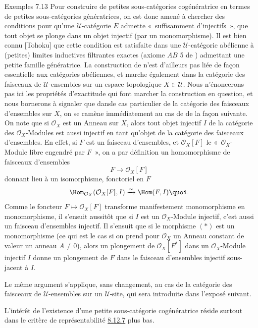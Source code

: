\begin{enonce*}[remark]{Exemples 7.13}
Pour construire de petites sous-catégories cogénératrice en termes
de petites sous-catégories génératrices, on est donc amené à
chercher des conditions pour qu'une $𝒰$-catégorie $E$
admette « suffisamment d'injectifs », \ie que tout objet se
plonge dans un objet injectif (par un monomorphisme). Il est bien
connu [Tohoku] que cette condition est satisfaite dans une
$𝒰$-catégorie abélienne à (petites) limites inductives
filtrantes exactes (axiome $AB$ 5 de \loccit) admettant une petite
famille génératrice. La construction de \loccit n'est d'ailleurs pas
liée de façon essentielle aux catégories abéliennes, et marche
également dans la catégorie des faisceaux de $𝒰$-ensembles
sur un espace topologique $X\in 𝒰$. Nous n'énoncerons pas
ici les propriétés d'exactitude qui font marcher la construction en
question, et nous bornerons à signaler que dans\pageoriginale le cas
particulier de la catégorie des faisceaux d'ensembles sur $X$, on se
ramène immédiatement au cas de \loccit de la façon suivante. On note
que si $\mathcal{O}_X$ est un Anneau sur $X$, alors tout objet
injectif $I$ de la catégorie des $\mathcal{O}_X$-Modules est aussi
injectif en tant qu'objet de la catégorie des faisceaux d'ensembles.
En effet, si $F$ est un %
faisceau d'ensembles, et $\mathcal{O}_X[F]$ le « $\mathcal{O}_X$-Module libre engendré par $F$ », on a par
définition un homomorphisme de faisceaux d'ensembles
\begin{equation*}
F\longrightarrow \mathcal{O}_X[F]\tag{$\ast$}
\end{equation*}
donnant lieu à un isomorphisme, fonctoriel en $F$
$$
\Hom_{\mathcal{O}_X}(\mathcal{O}_X[F], I)\xrightarrow{\sim} \Hom
(F,I){\quoi}.
$$
Comme le foncteur $F\mapsto \mathcal{O}_X[F]$ transforme
manifestement monomorphisme en monomorphisme, il s'ensuit aussitôt
que si $I$ est un $\mathcal{O}_X$-Module injectif, c'est aussi un
faisceau d'ensembles injectif. Il s'ensuit que si le morphisme
$(\ast)$ est un monomorphisme (ce qui est le cas si on prend pour
$\mathcal{O}_X$ un Anneau constant de valeur un anneau $A\neq 0$),
alors un plongement de $\mathcal{O}_X[F^\ast]$ dans un
$\mathcal{O}_X$-Module injectif $I$ donne un plongement de $F$ dans
le faisceau d'ensembles injectif sous-jacent à $I$.
\end{enonce*}

Le même argument s'applique, sans changement, au cas de la catégorie
des faisceaux de $𝒰$-ensembles sur un $𝒰$-site, qui
sera introduite dans l'exposé suivant.

L'intérêt de l'existence d'une petite sous-catégorie
cogénératrice
réside surtout dans le critère de représentabilité
\hyperref[I.cor8.12.7]{8.12.7} plus
bas.

\setcounter{section}{7}
